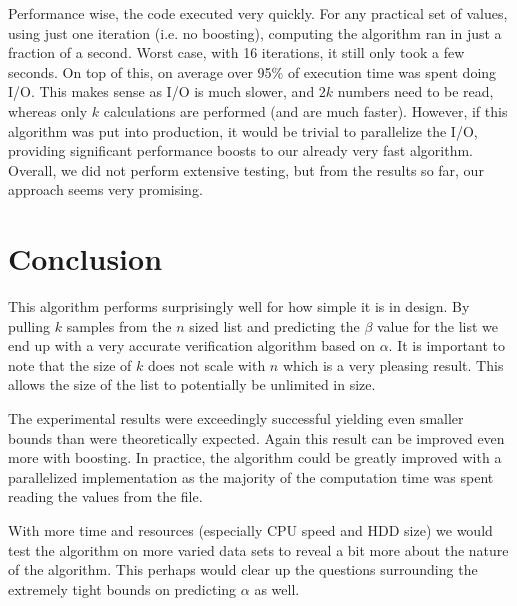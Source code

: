 \documentclass[11pt]{article}
\begin{document}
Performance wise, the code executed very quickly. For any practical set of values, using just one iteration (i.e. no boosting), computing the algorithm ran in just a fraction of a second. Worst case, with 16 iterations, it still only took a few seconds. On top of this, on average over 95\% of execution time was spent doing I/O. This makes sense as I/O is much slower, and $2k$ numbers need to be read, whereas only $k$ calculations are performed (and are much faster). However, if this algorithm was put into production, it would be trivial to parallelize the I/O, providing significant performance boosts to our already very fast algorithm. Overall, we did not perform extensive testing, but from the results so far, our approach seems very promising.

\section{Conclusion}

This algorithm performs surprisingly well for how simple it is in design. By pulling $k$ samples from the $n$ sized list and predicting the $\beta$ value for the list we end up with a very accurate verification algorithm based on $\alpha$. It is important to note that the size of $k$ does not scale with $n$ which is a very pleasing result. This allows the size of the list to potentially be unlimited in size.  

The experimental results were exceedingly successful yielding even smaller bounds than were theoretically expected. Again this result can be improved even more with boosting. In practice, the algorithm could be greatly improved with a parallelized implementation as the majority of the computation time was spent reading the values from the file. 

With more time and resources (especially CPU speed and HDD size) we would test the algorithm on more varied data sets to reveal a bit more about the nature of the algorithm. This perhaps would clear up the questions surrounding the extremely tight bounds on predicting $\alpha$ as well. 
\end{document}
